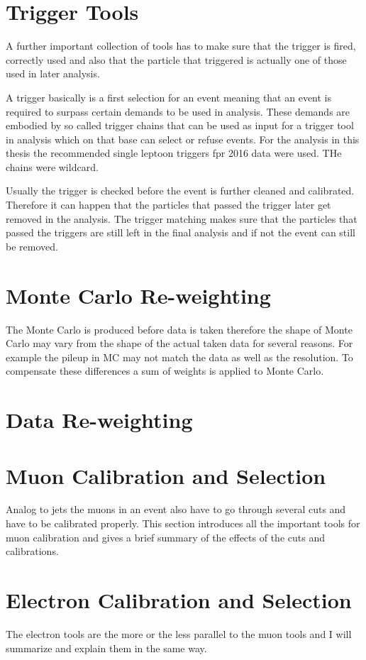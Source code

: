\section{Trigger Tools}

A further important collection of tools has to make sure that the trigger is fired, correctly used and also that the particle that triggered is actually one of those used in later analysis.

A trigger basically is a first selection for an event meaning that an event is required to surpass certain demands to be used in analysis. These demands are embodied by so called trigger chains that can be used as input for a trigger tool in analysis which on that base can select or refuse events. For the analysis in this thesis the recommended single leptoon triggers fpr 2016 data were used. THe chains were wildcard.

Usually the trigger is checked before the event is further cleaned and calibrated. Therefore it can happen that the particles that passed the trigger later get removed in the analysis. The trigger matching makes sure that the particles that passed the triggers are still left in the final analysis and if not the event can still be removed.

\section{Monte Carlo Re-weighting}

The Monte Carlo is produced before data is taken therefore the shape of Monte Carlo may vary from the shape of the actual taken data for several reasons. For example the pileup in MC may not match the data as well as the resolution. To compensate these differences a sum of weights is applied to Monte Carlo.

\section{Data Re-weighting}

\section{Muon Calibration and Selection}

Analog to jets the muons in an event also have to go through several cuts and have to be calibrated properly. This section introduces all the important tools for muon calibration and gives a brief summary of the effects of the cuts and calibrations.

\section{Electron Calibration and Selection}

The electron tools are the more or the less parallel to the muon tools and I will summarize and explain them in the same way.